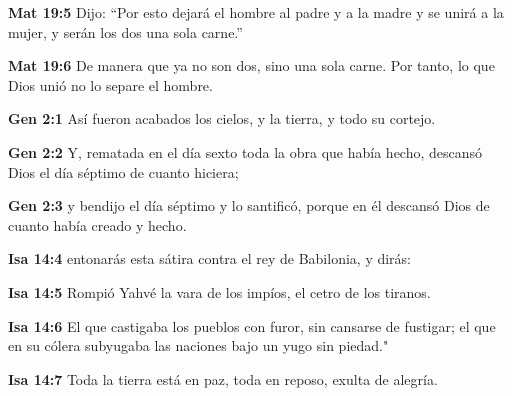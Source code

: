 \textbf{Mat 19:5} Dijo: “Por esto dejará el hombre al padre y a la madre y se unirá a la mujer, y serán los dos una sola carne.” 

\textbf{Mat 19:6} De manera que ya no son dos, sino una sola carne. Por tanto, lo que Dios unió no lo separe el hombre. 

\textbf{Gen 2:1} Así fueron acabados los cielos, y la tierra, y todo su cortejo. 

\textbf{Gen 2:2} Y, rematada en el día sexto toda la obra que había hecho, descansó Dios el día séptimo de cuanto hiciera; 

\textbf{Gen 2:3} y bendijo el día séptimo y lo santificó, porque en él descansó Dios de cuanto había creado y hecho. 

\textbf{Isa 14:4} entonarás esta sátira contra el rey de Babilonia, y dirás: 

\textbf{Isa 14:5} Rompió Yahvé la vara de los impíos, el cetro de los tiranos. 

\textbf{Isa 14:6} El que castigaba los pueblos con furor, sin cansarse de fustigar; el que en su cólera subyugaba las naciones bajo un yugo sin piedad." 

\textbf{Isa 14:7} Toda la tierra está en paz, toda en reposo, exulta de alegría. 


\nopagebreak

\blEndBook


